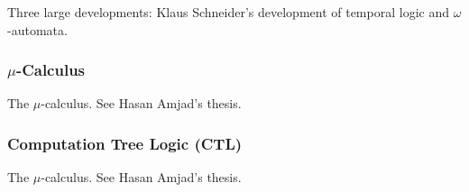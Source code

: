 Three large developments: Klaus Schneider's development of temporal logic and $\omega$-automata.

\subsubsection{$\mu$-Calculus}

The $\mu$-calculus. See Hasan Amjad's thesis.
\subsubsection{Computation Tree Logic (CTL)}
The $\mu$-calculus. See Hasan Amjad's thesis.

